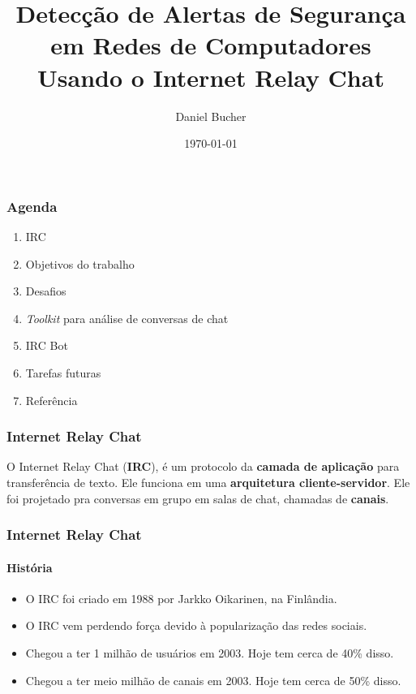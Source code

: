 \documentclass{beamer}
\title[AP3]{Detecção de Alertas de Segurança em Redes de Computadores Usando
o Internet Relay Chat}
\author{Daniel Bucher} %
\institute[USP] %
{
Universidade de São Paulo \\ %
\medskip
\textit{dbucher@ime.usp.br} %
}
\date{\today} %
\begin{document}
\begin{frame}
\titlepage %
\end{frame}

\begin{frame}
\frametitle{Agenda}

\begin{enumerate}
    \item{IRC}
    \item{Objetivos do trabalho}
    \item{Desafios}
    \item{\textit{Toolkit} para análise de conversas de chat}
    \item{IRC Bot}
    \item{Tarefas futuras}
    \item{Referência}
\end{enumerate}
\end{frame}

\begin{frame}
\frametitle{Internet Relay Chat}

O Internet Relay Chat (\textbf{IRC}), é um protocolo da \textbf{camada de aplicação} para transferência de texto. Ele funciona em uma \textbf{arquitetura
cliente-servidor}. Ele foi projetado pra conversas em grupo em salas de chat,
chamadas de \textbf{canais}.

\end{frame}

\begin{frame}
\frametitle{Internet Relay Chat}
\framesubtitle{História}

  \begin{itemize}
    \setlength\itemsep{0.8em}
    \item O IRC foi criado em 1988 por Jarkko Oikarinen, na Finlândia.
    \item O IRC vem perdendo força devido à popularização das redes sociais.
    \item Chegou a ter 1 milhão de usuários em 2003. Hoje tem cerca de 40\%
    disso.
    \item Chegou a ter meio milhão de canais em 2003. Hoje tem cerca de 50\%
    disso.
  \end{itemize}

\end{frame}
\end{document}
